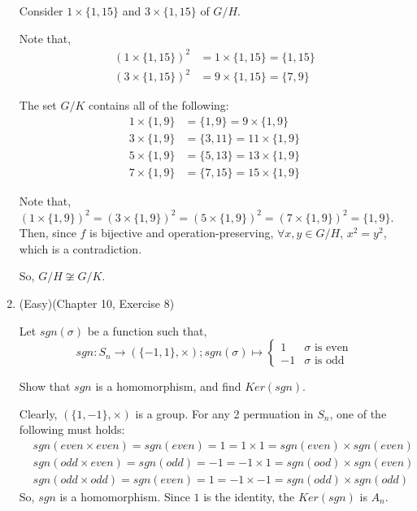 \documentclass[12pt]{article}
\begin{document}
\begin{enumerate}
        Consider $1 \times \{1,15 \}$ and $3 \times \{1,15\}$ of $G/H$. 
        
        Note that,
        \begin{align*}
            (1\times\{1,15\})^2 &= 1 \times \{1,15\} = \{1,15\}\\
            (3\times\{1,15\})^2 &= 9 \times \{1,15\} = \{7,9\}
        \end{align*} 

        The set $G/K$ contains all of the following: 
        \begin{align*}
            1 \times \{1,9\} &= \{1,9\} = 9 \times \{1,9\}\\
            3 \times \{1,9\} &= \{3,11\} = 11 \times \{1,9\}\\
            5 \times \{1,9\} &= \{5,13\} = 13 \times \{1,9\}\\
            7 \times \{1,9\} &= \{7,15\} = 15 \times \{1,9\}
        \end{align*}

        Note that, $(1\times \{1,9\})^2 = (3\times \{1,9\})^2 = (5 \times \{1,9\})^2 = (7 \times \{1,9\})^2 = \{1,9\}$. Then, since $f$ is bijective and operation-preserving, $\forall x, y \in G/H$, $x^2 = y^2$, which is a contradiction.  

        So, $G/H \not \cong G/K$.
        \pagebreak

    \item (Easy)(Chapter 10, Exercise 8) 
    
        Let $sgn(\sigma)$ be a function such that, $$sgn: S_n \to (\{-1, 1\}, \times); sgn(\sigma) \mapsto \begin{cases} 1 & \sigma \text{ is even} \\ -1 & \sigma \text{ is odd}\end{cases}$$

        Show that $sgn$ is a homomorphism, and find $Ker(sgn)$. 

        Clearly, $(\{1,-1\}, \times)$ is a group.
        For any 2 permuation in $S_n$, one of the following must holds:
        \begin{align*}
            &sgn(even \times even) = sgn(even) = 1 = 1 \times 1 = sgn(even) \times sgn(even)\\
            &sgn(odd \times even) = sgn(odd) = -1 = -1 \times 1 = sgn(ood) \times sgn(even)\\
            &sgn(odd \times odd) = sgn(even) = 1 = -1 \times -1 = sgn(odd) \times sgn(odd)
        \end{align*}
        So, $sgn$ is a homomorphism. Since $1$ is the identity, the $Ker(sgn)$ is $A_n$. 
        \pagebreak


\end{enumerate}
\end{document}
